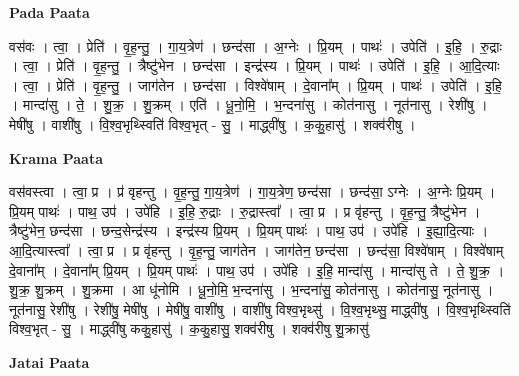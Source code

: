 \documentclass[17pt]{extarticle}
\begin{document}
\textbf{Pada Paata} \newline

वस॑वः । त्वा॒ । प्रेति॑ । वृ॒ह॒न्तु॒ । गा॒य॒त्रेण॑ । छन्द॑सा । अ॒ग्नेः । प्रि॒यम् । पाथः॑ । उपेति॑ । इ॒हि॒ । रु॒द्राः । त्वा॒ । प्रेति॑ । वृ॒ह॒न्तु॒ । त्रैष्टु॑भेन । छन्द॑सा । इन्द्र॑स्य । प्रि॒यम् । पाथः॑ । उपेति॑ । इ॒हि॒ । आ॒दि॒त्याः । त्वा॒ । प्रेति॑ । वृ॒ह॒न्तु॒ । जाग॑तेन । छन्द॑सा । विश्वे॑षाम् । दे॒वाना᳚म् । प्रि॒यम् । पाथः॑ । उपेति॑ । इ॒हि॒ । मान्दा॑सु । ते॒ । शु॒क्र॒ । शु॒क्रम् । एति॑ । धू॒नो॒मि॒ । भ॒न्दना॑सु । कोत॑नासु । नूत॑नासु । रेशी॑षु । मेषी॑षु । वाशी॑षु । वि॒श्व॒भृथ्स्विति॑ विश्व॒भृत् - सु॒ । माद्ध्वी॑षु । क॒कु॒हासु॑ । शक्व॑रीषु ।  \newline


\textbf{Krama Paata} \newline

वस॑वस्त्वा । त्वा॒ प्र । प्र॑ वृहन्तु । वृ॒ह॒न्तु॒ गा॒य॒त्रेण॑ । गा॒य॒त्रेण॒ छन्द॑सा । छन्द॑सा॒ ऽग्नेः । अ॒ग्नेः प्रि॒यम् । प्रि॒यम् पाथः॑ । पाथ॒ उप॑ । उपे॑हि । इ॒हि॒ रु॒द्राः । रु॒द्रास्त्वा᳚ । त्वा॒ प्र । प्र वृ॑हन्तु । वृ॒ह॒न्तु॒ त्रैष्टु॑भेन । त्रैष्टु॑भेन॒ छन्द॑सा । छन्द॒सेन्द्र॑स्य । इन्द्र॑स्य प्रि॒यम् । प्रि॒यम् पाथः॑ । पाथ॒ उप॑ । उपे॑हि । इ॒ह्या॒दि॒त्याः । आ॒दि॒त्यास्त्वा᳚ । त्वा॒ प्र । प्र वृ॑हन्तु । वृ॒ह॒न्तु॒ जाग॑तेन । जाग॑तेन॒ छन्द॑सा । छन्द॑सा॒ विश्वे॑षाम् । विश्वे॑षाम् दे॒वाना᳚म् । दे॒वाना᳚म् प्रि॒यम् । प्रि॒यम् पाथः॑ । पाथ॒ उप॑ । उपे॑हि । इ॒हि॒ मान्दा॑सु । मान्दा॑सु ते । ते॒ शु॒क्र॒ । शु॒क्र॒ शु॒क्रम् । शु॒क्रमा । आ धू॑नोमि । धू॒नो॒मि॒ भ॒न्दना॑सु । भ॒न्दना॑सु॒ कोत॑नासु । कोत॑नासु॒ नूत॑नासु । नूत॑नासु॒ रेशी॑षु । रेशी॑षु॒ मेषी॑षु । मेषी॑षु॒ वाशी॑षु । वाशी॑षु विश्व॒भृथ्सु॑ । वि॒श्व॒भृथ्सु॒ माद्ध्वी॑षु । वि॒श्व॒भृथ्स्विति॑ विश्व॒भृत् - सु॒ । माद्ध्वी॑षु ककु॒हासु॑ । क॒कु॒हासु॒ शक्व॑रीषु । शक्व॑रीषु शु॒क्रासु॑ \newline

\textbf{Jatai Paata} \newline
\end{document}
